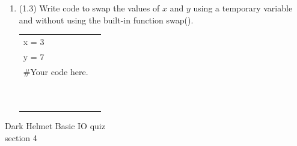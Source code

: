 \documentclass{article}
\begin{document}
\begin{enumerate}

\item (1.3) 
		Write code to swap the values of $x$ and $y$ using a temporary variable and without using
		the built-in function swap().\\		
		\begin{tabular}{|ll}
			\\			
			x = 3\\
			y = 7\\[5pt]
			\#Your code here. \\[5pt]
			& \\ & \\ & \\ & \\ & \\ & \\ & \\ & \\ & \\ & \\ 
		\end{tabular}



\end{enumerate}
\pagebreak
Dark Helmet \hfill Basic IO quiz\\
section 4\\
\end{document}
